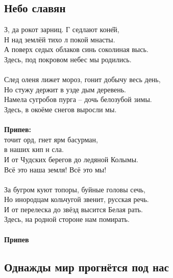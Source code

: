 \documentclass[fleqn,a5paper,12pt,twoside]{guitartabs}
\begin{document}
\subsection*{Небо славян }
    З, да рокот зарниц. Г седлают кон\G{ей}, \\
    Н над землёй тихо л покой мнасты.  \\
    А поверх седых облаков  синь соколиная высь. \\
    Здесь, под покровом небес мы родились.\\
    \\
    След оленя лижет мороз,  гонит добычу весь день, \\
    Но стужу держит в узде дым деревень.  \\
    Намела сугробов пурга -- дочь белозубой зимы. \\
    Здесь, в окоёме снегов выросли мы.\\
    \\
    \-\hspace{10mm}\textbf{Припев:}\\
    \-\hspace{10mm} точит  орд,  гнет ярм басурман, \\
    \-\hspace{10mm} в наших  кип н сла. \\
    \-\hspace{10mm}И от Чудских берегов до ледяной Колымы. \\
    \-\hspace{10mm}Всё это наша земля! Всё это мы!\\
    \\
    За бугром куют топоры, буйные головы сечь, \\
    Но инородцам кольчугой звенит, русская речь.\\
    И от перелеска до звёзд  высится Белая рать. \\
    Здесь, на родной стороне нам помирать.\\
    \\
    \-\hspace{10mm}\textbf{Припев}
\newpage
{}%
\subsection*{Однажды мир прогнётся под нас}
\end{document}
